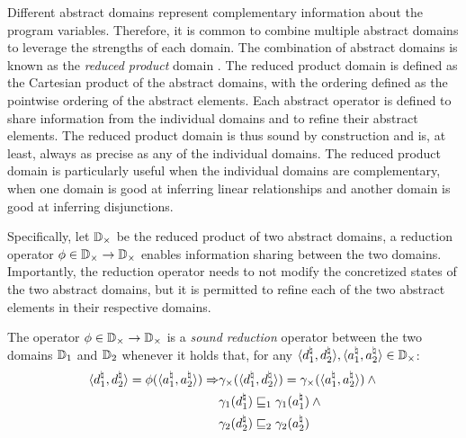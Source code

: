 Different abstract domains represent complementary information about the program variables. Therefore, it is common to combine multiple abstract domains to leverage the strengths of each domain. The combination of abstract domains is known as the \emph{reduced product} domain . The reduced product domain is defined as the Cartesian product of the abstract domains, with the ordering defined as the pointwise ordering of the abstract elements. Each abstract operator is defined to share information from the individual domains and to refine their abstract elements.
The reduced product domain is thus sound by construction and is, at least, always as precise as any of the individual domains. The reduced product domain is particularly useful when the individual domains are complementary, \eg{} when one domain is good at inferring linear relationships and another domain is good at inferring disjunctions.

Specifically, let $\mathbb{D}_{\times}$ be the reduced product of two abstract domains, a reduction operator $\phi\in\mathbb{D}_{\times}\to\mathbb{D}_{\times}$ enables information sharing between the two domains.
Importantly, the reduction operator needs to not modify the concretized states of the two abstract domains, but it is permitted to refine each of the two abstract elements in their respective domains.

\begin{definition}
  The operator $\phi\in\mathbb{D}_{\times}\to\mathbb{D}_{\times}$ is a \emph{sound reduction} operator between the two domains $\mathbb{D}_1$ and $\mathbb{D}_2$ whenever it holds that, for any $\langle d^\natural_1, d^\natural_2 \rangle, \langle a^\natural_1, a^\natural_2 \rangle \in \mathbb{D}_{\times}$:
  \begin{align*}
    \langle d^\natural_1, d^\natural_2 \rangle = \phi(\langle a^\natural_1, a^\natural_2 \rangle) \Rightarrow
    &\gamma_{\times}(\langle d^\natural_1, d^\natural_2 \rangle) = \gamma_{\times}(\langle a^\natural_1, a^\natural_2 \rangle) \land {} \\
    &\gamma_1(d^\natural_1) \sqsubseteq_1 \gamma_1(a^\natural_1) \land {} \\
    &\gamma_2(d^\natural_2) \sqsubseteq_2 \gamma_2(a^\natural_2)
  \end{align*}
\end{definition}

